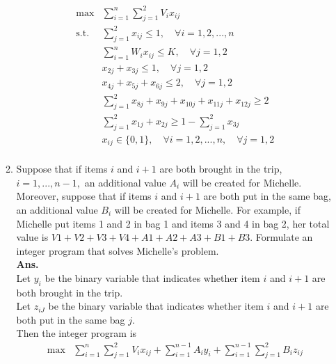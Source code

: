 \documentclass[14pt]{article}
\begin{document}
\begin{enumerate}
\begin{enumerate}
\begin{align*}
                              \text{max}   & \sum_{i=1}^n\sum_{j=1}^2 V_ix_{ij}                                          \\
                              \text{s.t. } & \sum_{j=1}^2 x_{ij} \leq 1, \quad \forall i = 1, 2, ..., n                  \\
                                           & \sum_{i=1}^n W_ix_{ij} \leq K, \quad \forall j = 1, 2                       \\
                                           & x_{2j}+x_{3j} \leq 1, \quad \forall j = 1, 2                                \\
                                           & x_{4j}+x_{5j}+x_{6j} \leq 2, \quad \forall j = 1, 2                         \\
                                           & \sum_{j=1}^2 x_{8j}+x_{9j}+x_{10j}+x_{11j}+x_{12j} \geq 2                   \\
                                           & \sum_{j=1}^2x_{1j}+x_{2j} \geq 1-\sum_{j=1}^2x_{3j}                         \\
                                           & x_{ij} \in \{0, 1\}, \quad \forall i = 1, 2, ..., n, \quad \forall j = 1, 2 \\
                        \end{align*}
                  \item Suppose that if items $i$ and $i + 1$ are both brought in the trip, $i = 1, ..., n - 1,$ an additional value $A_i$ will be created for Michelle. Moreover, suppose that if items $i$ and $i + 1$ are both put in the same bag, an additional value $B_i$ will be created for Michelle. For example, if Michelle put items 1 and 2 in bag 1 and items 3 and 4 in bag 2, her total value is $V1 + V2 + V3 + V4 + A1 + A2 + A3 + B1 + B3$. Formulate an integer program that solves Michelle’s problem.\\
                        \textbf{Ans. }\\
                        Let $y_i$ be the binary variable that indicates whether item $i$ and $i+1$ are both brought in the trip.\\
                        Let $z_{iJ}$ be the binary variable that indicates whether item $i$ and $i+1$ are both put in the same bag $j$.\\
                        Then the integer program is
                        \begin{align*}
                              \text{max}  & \sum_{i=1}^n\sum_{j=1}^2 V_ix_{ij} + \sum_{i=1}^{n-1}A_iy_i + \sum_{i=1}^{n-1}\sum_{j=1}^2B_iz_{ij} \\

\end{align*}
\end{enumerate}
\end{enumerate}
\end{document}
